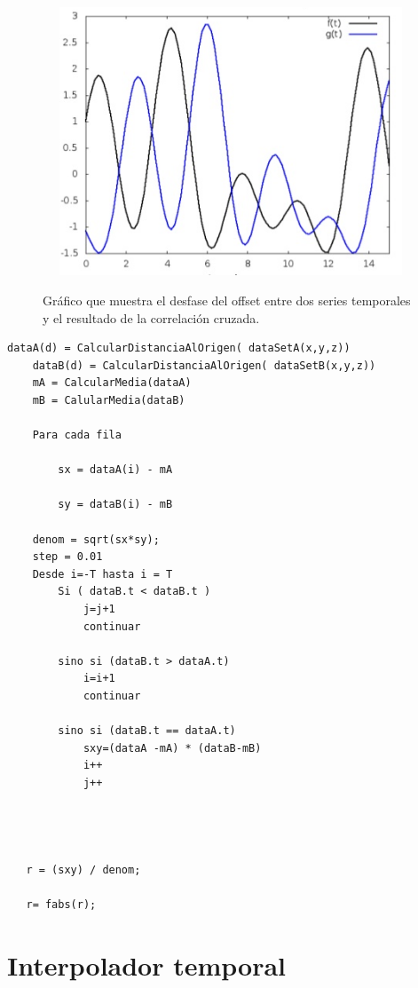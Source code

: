 \begin{figure}[H]
\begin{center}
\label{fig:opciones de View}\includegraphics[height=8.0cm,width=12.0cm]{img/cap5/correlacionCruzada2.png}
\hspace{0.5cm}

\end{center}

\caption{Gráfico que muestra el desfase del offset entre dos series temporales y el resultado de la correlación cruzada.}
\end{figure}
	                                
	\begin{lstlisting}[frame=single]
	dataA(d) = CalcularDistanciaAlOrigen( dataSetA(x,y,z))
	dataB(d) = CalcularDistanciaAlOrigen( dataSetB(x,y,z))
	mA = CalcularMedia(dataA)
	mB = CalularMedia(dataB)

	Para cada fila

   		sx = dataA(i) - mA

   		sy = dataB(i) - mB

   	denom = sqrt(sx*sy);
   	step = 0.01
   	Desde i=-T hasta i = T
   		Si ( dataB.t < dataB.t )
			j=j+1
    		continuar

    	sino si (dataB.t > dataA.t)
    		i=i+1
    		continuar

    	sino si (dataB.t == dataA.t)
    		sxy=(dataA -mA) * (dataB-mB)
        	i++
        	j++


   

   r = (sxy) / denom;

   r= fabs(r);
    \end{lstlisting}



\section{Interpolador temporal}

